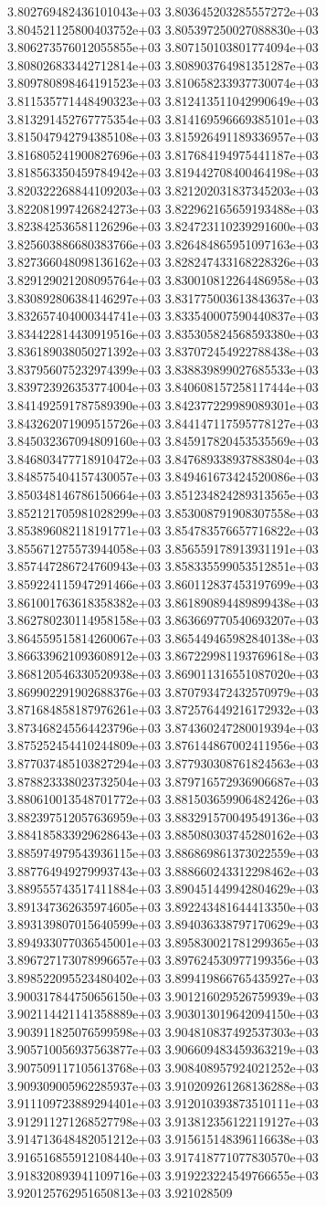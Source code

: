 3.802769482436101043e+03	3.803645203285557272e+03	3.804521125800403752e+03	3.805397250027088830e+03	3.806273576012055855e+03	3.807150103801774094e+03	3.808026833442712814e+03	3.808903764981351287e+03	3.809780898464191523e+03	3.810658233937730074e+03	3.811535771448490323e+03	3.812413511042990649e+03	3.813291452767775354e+03	3.814169596669385101e+03	3.815047942794385108e+03	3.815926491189336957e+03	3.816805241900827696e+03	3.817684194975441187e+03	3.818563350459784942e+03	3.819442708400464198e+03	3.820322268844109203e+03	3.821202031837345203e+03	3.822081997426824273e+03	3.822962165659193488e+03	3.823842536581126296e+03	3.824723110239291600e+03	3.825603886680383766e+03	3.826484865951097163e+03	3.827366048098136162e+03	3.828247433168228326e+03	3.829129021208095764e+03	3.830010812264486958e+03	3.830892806384146297e+03	3.831775003613843637e+03	3.832657404000344741e+03	3.833540007590440837e+03	3.834422814430919516e+03	3.835305824568593380e+03	3.836189038050271392e+03	3.837072454922788438e+03	3.837956075232974399e+03	3.838839899027685533e+03	3.839723926353774004e+03	3.840608157258117444e+03	3.841492591787589390e+03	3.842377229989089301e+03	3.843262071909515726e+03	3.844147117595778127e+03	3.845032367094809160e+03	3.845917820453535569e+03	3.846803477718910472e+03	3.847689338937883804e+03	3.848575404157430057e+03	3.849461673424520086e+03	3.850348146786150664e+03	3.851234824289313565e+03	3.852121705981028299e+03	3.853008791908307558e+03	3.853896082118191771e+03	3.854783576657716822e+03	3.855671275573944058e+03	3.856559178913931191e+03	3.857447286724760943e+03	3.858335599053512851e+03	3.859224115947291466e+03	3.860112837453197699e+03	3.861001763618358382e+03	3.861890894489899438e+03	3.862780230114958158e+03	3.863669770540693207e+03	3.864559515814260067e+03	3.865449465982840138e+03	3.866339621093608912e+03	3.867229981193769618e+03	3.868120546330520938e+03	3.869011316551087020e+03	3.869902291902688376e+03	3.870793472432570979e+03	3.871684858187976261e+03	3.872576449216172932e+03	3.873468245564423796e+03	3.874360247280019394e+03	3.875252454410244809e+03	3.876144867002411956e+03	3.877037485103827294e+03	3.877930308761824563e+03	3.878823338023732504e+03	3.879716572936906687e+03	3.880610013548701772e+03	3.881503659906482426e+03	3.882397512057636959e+03	3.883291570049549136e+03	3.884185833929628643e+03	3.885080303745280162e+03	3.885974979543936115e+03	3.886869861373022559e+03	3.887764949279993743e+03	3.888660243312298462e+03	3.889555743517411884e+03	3.890451449942804629e+03	3.891347362635974605e+03	3.892243481644413350e+03	3.893139807015640599e+03	3.894036338797170629e+03	3.894933077036545001e+03	3.895830021781299365e+03	3.896727173078996657e+03	3.897624530977199356e+03	3.898522095523480402e+03	3.899419866765435927e+03	3.900317844750656150e+03	3.901216029526759939e+03	3.902114421141358889e+03	3.903013019642094150e+03	3.903911825076599598e+03	3.904810837492537303e+03	3.905710056937563877e+03	3.906609483459363219e+03	3.907509117105613768e+03	3.908408957924021252e+03	3.909309005962285937e+03	3.910209261268136288e+03	3.911109723889294401e+03	3.912010393873510111e+03	3.912911271268527798e+03	3.913812356122119127e+03	3.914713648482051212e+03	3.915615148396116638e+03	3.916516855912108440e+03	3.917418771077830570e+03	3.918320893941109716e+03	3.919223224549766655e+03	3.920125762951650813e+03	3.921028509